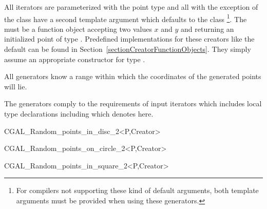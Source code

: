 All iterators are parameterized with the point type  and all
with the exception of the class  have a second
template argument  which defaults to the class
\footnote{%
  For compilers not supporting these kind of default arguments, both
  template arguments must be provided when using these generators.}.
The  must be a function object accepting two 
values $x$ and $y$ and returning an initialized point  of type
. Predefined implementations for these creators like the
default can be found in Section~\ref{sectionCreatorFunctionObjects}.
They simply assume an appropriate constructor for type .

All generators know a range within which the coordinates of the
generated points will lie.


\ccTypes

The generators comply to the requirements of input iterators which
includes local type declarations including  which
denotes  here.

\ccCreation
\ccTwo{}{\hspace*{11cm}}

\ccHtmlNoClassFile
\begin{ccClassTemplate}{CGAL_Random_points_in_disc_2<P,Creator>}
\end{ccClassTemplate}

\ccHtmlNoClassFile
\begin{ccClassTemplate}{CGAL_Random_points_on_circle_2<P,Creator>}
\end{ccClassTemplate}

\ccHtmlNoClassFile
\begin{ccClassTemplate}{CGAL_Random_points_in_square_2<P,Creator>}
\end{ccClassTemplate}

